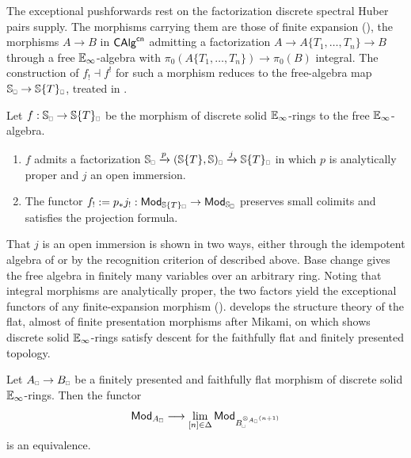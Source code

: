 The exceptional pushforwards rest on the factorization discrete spectral Huber pairs supply. The morphisms carrying them are those of finite expansion (), the morphisms $A\to B$ in $\mathsf{CAlg}^{\mathsf{cn}}$ admitting a factorization $A\to A\{T_{1},\dots,T_{n}\}\to B$ through a free $\mathbb{E}_{\infty}$-algebra with $\pi_{0}(A\{T_{1},\dots,T_{n}\})\to\pi_{0}(B)$ integral. The construction of $f_{!}\dashv f^{!}$ for such a morphism reduces to the free-algebra map $\Sph_{\sld}\to\Sph\{T\}_{\sld}$, treated in .
\begin{proposition*}[\ref{prop: exceptional functors for the affine line}]
    Let $f:\Sph_{\sld}\to\Sph\{T\}_{\sld}$ be the morphism of discrete solid $\mathbb{E}_{\infty}$-rings to the free $\mathbb{E}_{\infty}$-algebra.
    \begin{enumerate}
        \item $f$ admits a factorization $\Sph_{\sld}\xrightarrow{p}(\Sph\{T\},\Sph)_{\sld}\xrightarrow{j}\Sph\{T\}_{\sld}$ in which $p$ is analytically proper and $j$ an open immersion.
        \item The functor $f_{!}:=p_{*}j_{!}:\Mod_{\Sph\{T\}_{\sld}}\to\Mod_{\Sph_{\sld}}$ preserves small colimits and satisfies the projection formula.
    \end{enumerate}
\end{proposition*}
That $j$ is an open immersion is shown in two ways, either through the idempotent algebra of  or by the recognition criterion of  described above. Base change gives the free algebra in finitely many variables over an arbitrary ring. Noting that integral morphisms are analytically proper, the two factors yield the exceptional functors of any finite-expansion morphism ().  develops the structure theory of the flat, almost of finite presentation morphisms after Mikami, on which  shows discrete solid $\mathbb{E}_{\infty}$-rings satisfy descent for the faithfully flat and finitely presented topology.
\begin{theorem*}[\ref{thm: solid fppf descent}]
    Let $A_{\sld}\to B_{\sld}$ be a finitely presented and faithfully flat morphism of discrete solid $\mathbb{E}_{\infty}$-rings. Then the functor
    $$\Mod_{A_{\sld}}\longrightarrow\lim_{[n]\in\Delta}\Mod_{B_{\tsld}^{\otimes_{A_{\tsld}}(n+1)}}$$
    is an equivalence.
\end{theorem*}
